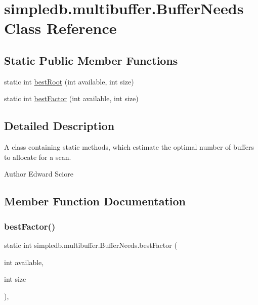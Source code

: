 \hypertarget{classsimpledb_1_1multibuffer_1_1BufferNeeds}{}\section{simpledb.\+multibuffer.\+Buffer\+Needs Class Reference}
\label{classsimpledb_1_1multibuffer_1_1BufferNeeds}
\subsection*{Static Public Member Functions}
\begin{DoxyCompactItemize}
\item 
static int \hyperlink{classsimpledb_1_1multibuffer_1_1BufferNeeds_ab3eff09df8f5c079b69df4a2939d7545}{best\+Root} (int available, int size)
\item 
static int \hyperlink{classsimpledb_1_1multibuffer_1_1BufferNeeds_a882f8972d386e83c271f4fe78753df10}{best\+Factor} (int available, int size)
\end{DoxyCompactItemize}


\subsection{Detailed Description}
A class containing static methods, which estimate the optimal number of buffers to allocate for a scan. \begin{DoxyAuthor}{Author}
Edward Sciore 
\end{DoxyAuthor}


\subsection{Member Function Documentation}
\mbox{\label{classsimpledb_1_1multibuffer_1_1BufferNeeds_a882f8972d386e83c271f4fe78753df10}} 
\subsubsection{\texorpdfstring{best\+Factor()}{bestFactor()}}
{\footnotesize\ttfamily static int simpledb.\+multibuffer.\+Buffer\+Needs.\+best\+Factor (\begin{DoxyParamCaption}\item[{int}]{available,  }\item[{int}]{size }\end{DoxyParamCaption})\hspace{0.3cm}{\ttfamily [inline]}, {\ttfamily [static]}}

